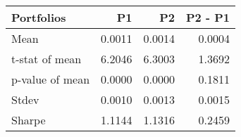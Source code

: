 \begin{tabular}{lrrr}
\toprule
Portfolios & P1 & P2 & P2 - P1 \\
\midrule
Mean & 0.0011 & 0.0014 & 0.0004 \\
t-stat of mean & 6.2046 & 6.3003 & 1.3692 \\
p-value of mean & 0.0000 & 0.0000 & 0.1811 \\
Stdev & 0.0010 & 0.0013 & 0.0015 \\
Sharpe & 1.1144 & 1.1316 & 0.2459 \\
\bottomrule
\end{tabular}

